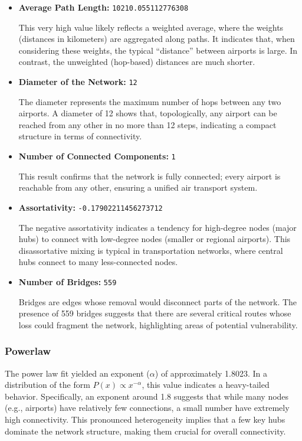 \documentclass[12pt]{article}
\begin{document}
    \begin{itemize}
        \item \textbf{Average Path Length:} \texttt{10210.055112776308}

        This very high value likely reflects a weighted average, where the weights (distances in kilometers) are aggregated along paths. It indicates that, when considering these weights, the typical ``distance'' between airports is large. In contrast, the unweighted (hop-based) distances are much shorter.

        \item \textbf{Diameter of the Network:} \texttt{12}

        The diameter represents the maximum number of hops between any two airports. A diameter of 12 shows that, topologically, any airport can be reached from any other in no more than 12 steps, indicating a compact structure in terms of connectivity.

        \item \textbf{Number of Connected Components:} \texttt{1}

        This result confirms that the network is fully connected; every airport is reachable from any other, ensuring a unified air transport system.

        \item \textbf{Assortativity:} \texttt{-0.17902211456273712}

        The negative assortativity indicates a tendency for high-degree nodes (major hubs) to connect with low-degree nodes (smaller or regional airports). This disassortative mixing is typical in transportation networks, where central hubs connect to many less-connected nodes.

        \item \textbf{Number of Bridges:} \texttt{559}

        Bridges are edges whose removal would disconnect parts of the network. The presence of 559 bridges suggests that there are several critical routes whose loss could fragment the network, highlighting areas of potential vulnerability.
    \end{itemize}

    \subsubsection{Powerlaw}
    The power law fit yielded an exponent ($\alpha$) of approximately 1.8023. In a distribution of the form \( P(x) \propto x^{-\alpha} \), this value indicates a heavy-tailed behavior. Specifically, an exponent around 1.8 suggests that while many nodes (e.g., airports) have relatively few connections, a small number have extremely high connectivity. This pronounced heterogeneity implies that a few key hubs dominate the network structure, making them crucial for overall connectivity.
\end{document}
